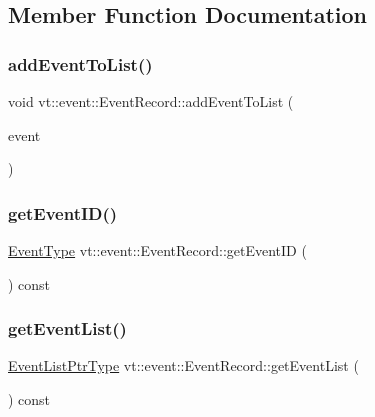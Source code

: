 \subsection{Member Function Documentation}
\mbox{\label{structvt_1_1event_1_1_event_record_aaeb3fbdfa74efbb88570ed88295af3ee}} 
\subsubsection{\texorpdfstring{add\+Event\+To\+List()}{addEventToList()}}
{\footnotesize\ttfamily void vt\+::event\+::\+Event\+Record\+::add\+Event\+To\+List (\begin{DoxyParamCaption}\item[{\hyperlink{namespacevt_a009267401def7ae8bf201892222d060f}{Event\+Type} const \&}]{event }\end{DoxyParamCaption})}

\mbox{\label{structvt_1_1event_1_1_event_record_a42de3f14e7aee457dfc44f6fdc57b874}} 
\subsubsection{\texorpdfstring{get\+Event\+I\+D()}{getEventID()}}
{\footnotesize\ttfamily \hyperlink{namespacevt_a009267401def7ae8bf201892222d060f}{Event\+Type} vt\+::event\+::\+Event\+Record\+::get\+Event\+ID (\begin{DoxyParamCaption}{ }\end{DoxyParamCaption}) const}

\mbox{\label{structvt_1_1event_1_1_event_record_abb891d63f4027f5d36d53d3080c33cdf}} 
\subsubsection{\texorpdfstring{get\+Event\+List()}{getEventList()}}
{\footnotesize\ttfamily \hyperlink{namespacevt_1_1event_aa507caad8ea8ee959ccef2d57753dceb}{Event\+List\+Ptr\+Type} vt\+::event\+::\+Event\+Record\+::get\+Event\+List (\begin{DoxyParamCaption}{ }\end{DoxyParamCaption}) const}

